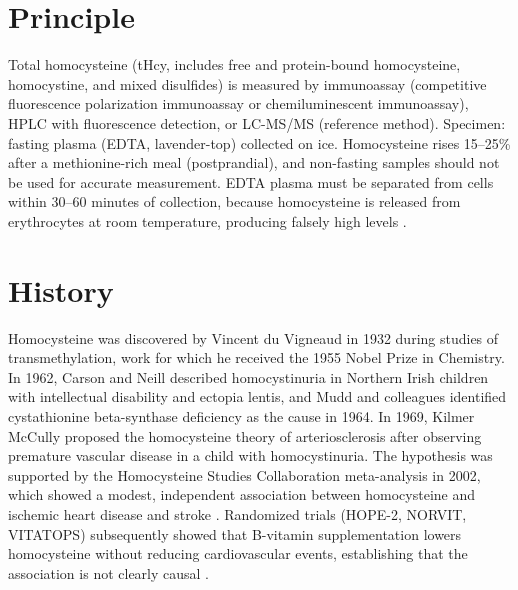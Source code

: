 \section*{Principle}
Total homocysteine (tHcy, includes free and protein-bound homocysteine, homocystine, and mixed disulfides) is measured by immunoassay (competitive fluorescence polarization immunoassay or chemiluminescent immunoassay), HPLC with fluorescence detection, or LC-MS/MS (reference method). Specimen: fasting plasma (EDTA, lavender-top) collected on ice. Homocysteine rises 15--25\% after a methionine-rich meal (postprandial), and non-fasting samples should not be used for accurate measurement. EDTA plasma must be separated from cells within 30--60 minutes of collection, because homocysteine is released from erythrocytes at room temperature, producing falsely high levels \cite{refsum2004facts}.
\section*{History}
Homocysteine was discovered by Vincent du Vigneaud in 1932 during studies of transmethylation, work for which he received the 1955 Nobel Prize in Chemistry. In 1962, Carson and Neill described homocystinuria in Northern Irish children with intellectual disability and ectopia lentis, and Mudd and colleagues identified cystathionine beta-synthase deficiency as the cause in 1964. In 1969, Kilmer McCully proposed the homocysteine theory of arteriosclerosis after observing premature vascular disease in a child with homocystinuria. The hypothesis was supported by the Homocysteine Studies Collaboration meta-analysis in 2002, which showed a modest, independent association between homocysteine and ischemic heart disease and stroke \cite{homocysteine2002homocysteine}. Randomized trials (HOPE-2, NORVIT, VITATOPS) subsequently showed that B-vitamin supplementation lowers homocysteine without reducing cardiovascular events, establishing that the association is not clearly causal \cite{clarke2010effects}.
